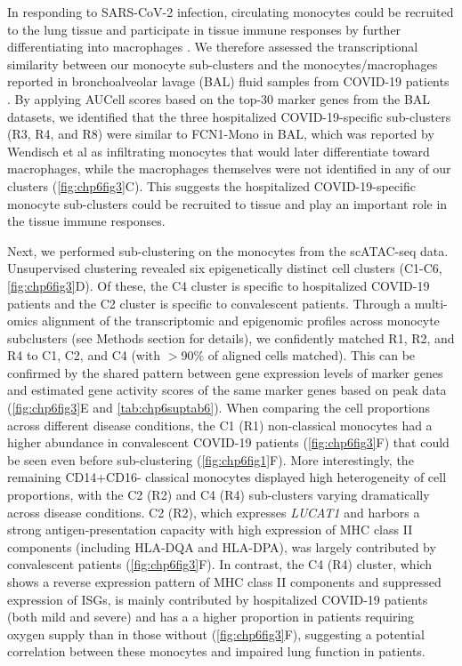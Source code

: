 \documentclass{book}
\begin{document}
\begin{refsection}
In responding to SARS-CoV-2 infection, circulating monocytes could be recruited to the lung tissue and participate in tissue immune responses by further differentiating into macrophages \cite{Charo2006The}.
We therefore assessed the transcriptional similarity between our monocyte sub-clusters and the monocytes/macrophages reported in bronchoalveolar lavage (BAL) fluid samples from COVID-19 patients \cite{Wendisch2021SARS}.
By applying AUCell scores based on the top-30 marker genes from the BAL datasets, we identified that the three hospitalized COVID-19-specific sub-clusters (R3, R4, and R8) were similar to FCN1-Mono in BAL, which was reported by Wendisch et al as infiltrating monocytes that would later differentiate toward macrophages, while the macrophages themselves were not identified in any of our clusters (\ref{fig:chp6fig3}C).
This suggests the hospitalized COVID-19-specific monocyte sub-clusters could be recruited to tissue and play an important role in the tissue immune responses.

Next, we performed sub-clustering on the monocytes from the scATAC-seq data.
Unsupervised clustering revealed six epigenetically distinct cell clusters (C1-C6, \ref{fig:chp6fig3}D).
Of these, the C4 cluster is specific to hospitalized COVID-19 patients and the C2 cluster is specific to convalescent patients.
Through a multi-omics alignment of the transcriptomic and epigenomic profiles across monocyte subclusters (see Methods section for details), we confidently matched R1, R2, and R4 to C1, C2, and C4 (with $>$90\% of aligned cells matched).
This can be confirmed by the shared pattern between gene expression levels of marker genes and estimated gene activity scores of the same marker genes based on peak data (\ref{fig:chp6fig3}E and \ref{tab:chp6suptab6}).
When comparing the cell proportions across different disease conditions, the C1 (R1) non-classical monocytes had a higher abundance in convalescent COVID-19 patients (\ref{fig:chp6fig3}F) that could be seen even before sub-clustering (\ref{fig:chp6fig1}F).
More interestingly, the remaining CD14+CD16- classical monocytes displayed high heterogeneity of cell proportions, with the C2 (R2) and C4 (R4) sub-clusters varying dramatically across disease conditions.
C2 (R2), which expresses \textit{LUCAT1} and harbors a strong antigen-presentation capacity with high expression of MHC class II components (including HLA-DQA and HLA-DPA), was largely contributed by convalescent patients (\ref{fig:chp6fig3}F).
In contrast, the C4 (R4) cluster, which shows a reverse expression pattern of MHC class II components and suppressed expression of ISGs, is mainly contributed by hospitalized COVID-19 patients (both mild and severe) and has a a higher proportion in patients requiring oxygen supply than in those without (\ref{fig:chp6fig3}F), suggesting a potential correlation between these monocytes and impaired lung function in patients.


\end{refsection}
\end{document}
